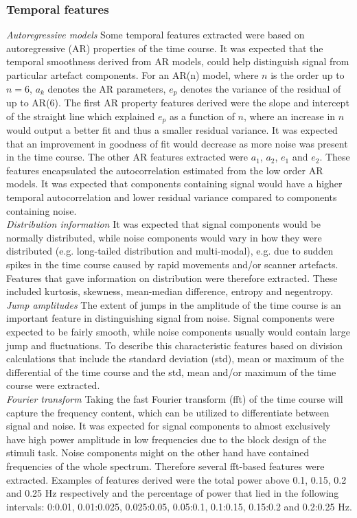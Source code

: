 \subsubsection{Temporal features}
\textit{Autoregressive models} Some temporal features extracted were based on autoregressive (AR) properties of the time course. It was expected that the temporal smoothness derived from AR models, could help distinguish signal from particular artefact components. For an AR(n) model, where $n$ is the order up to $n = 6$, $a_k$ denotes the AR parameters, $e_p$ denotes the variance of the residual of up to AR(6). The first AR property features derived were the slope and intercept of the straight line which explained $e_p$ as a function of $n$, where an increase in $n$ would output a better fit and thus a smaller residual variance. It was expected that an improvement in goodness of fit would decrease as more noise was present in the time course. 
The other AR features extracted were $a_1$, $a_2$, $e_1$ and $e_2$. These features encapsulated the autocorrelation estimated from the low order AR models. It was expected that components containing signal would have a higher temporal autocorrelation and lower residual variance compared to components containing noise. \\
\textit{Distribution information} It was expected that signal components would be normally distributed, while noise components would vary in how they were distributed (e.g. long-tailed distribution and multi-modal), e.g. due to sudden spikes in the time course caused by rapid movements and/or scanner artefacts. Features that gave information on distribution were therefore extracted. These included kurtosis, skewness, mean-median difference, entropy and negentropy. \\
\textit{Jump amplitudes} The extent of jumps in the amplitude of the time course is an important feature in distinguishing signal from noise. Signal components were expected to be fairly smooth, while noise components usually would contain large jump and fluctuations. To describe this characteristic features based on division calculations that include the standard deviation (std), mean or maximum of the differential of the time course and the std, mean and/or maximum of the time course were extracted. \\
\textit{Fourier transform} Taking the fast Fourier transform (fft) of the time course will capture the frequency content, which can be utilized to differentiate between signal and noise. It was expected for signal components to almost exclusively have high power amplitude in low frequencies due to the block design of the stimuli task. Noise components might on the other hand have contained frequencies of the whole spectrum. Therefore several fft-based features were extracted. Examples of features derived were the total power above 0.1, 0.15, 0.2 and 0.25 Hz respectively and the percentage of power that lied in the following intervals: 0:0.01, 0.01:0.025, 0.025:0.05, 0.05:0.1, 0.1:0.15, 0.15:0.2 and 0.2:0.25 Hz. \\
